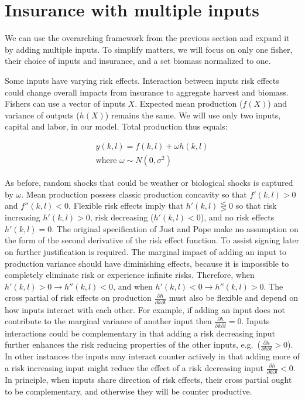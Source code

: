 \documentclass[
  letterpaper,
  DIV=11,
  numbers=noendperiod]{scrartcl}
\theoremstyle{plain}
\theoremstyle{plain}
\theoremstyle{remark}
\begin{document}
\hypertarget{sec-multi}{%
\section{Insurance with multiple inputs}\label{sec-multi}}

We can use the overarching framework from the previous section and
expand it by adding multiple inputs. To simplify matters, we will focus
on only one fisher, their choice of inputs and insurance, and a set
biomass normalized to one.

Some inputs have varying risk effects. Interaction between inputs risk
effects could change overall impacts from insurance to aggregate harvest
and biomass. Fishers can use a vector of inputs \(X\). Expected mean
production (\(f(X)\)) and variance of outputs (\(h(X)\)) remains the
same. We will use only two inputs, capital and labor, in our model.
Total production thus equals:

\[
\begin{aligned}
y(k,l)=f(k,l)+\omega h(k,l)\\
\text{where }\omega \sim N(0,\sigma^2)
\end{aligned}
\]

As before, random shocks that could be weather or biological shocks is
captured by \(\omega\). Mean production possess classic production
concavity so that \(f'(k,l)>0\) and \(f''(k,l)<0\). Flexible risk
effects imply that \(h'(k,l)\lesseqgtr0\) so that risk increasing
\(h'(k,l)>0\), risk decreasing (\(h'(k,l)<0\)), and no risk effects
\(h'(k,l)=0\). The original specification of Just and Pope make no
assumption on the form of the second derivative of the risk effect
function. To assist signing later on further justification is required.
The marginal impact of adding an input to production variance should
have diminishing effects, because it is impossible to completely
eliminate risk or experience infinite risks. Therefore, when
\(h'(k,l)>0 \rightarrow h''(k,l)<0\), and when
\(h'(k,l)<0 \rightarrow h''(k,l)>0\). The cross partial of risk effects
on production \(\frac{\partial h}{\partial k \partial l}\) must also be
flexible and depend on how inputs interact with each other. For example,
if adding an input does not contribute to the marginal variance of
another input then \(\frac{\partial h}{\partial k \partial l}=0\).
Inputs interactions could be complementary in that adding a risk
decreasing input further enhances the risk reducing properties of the
other inputs, e.g.~(\(\frac{\partial h}{\partial k \partial l}>0\)). In
other instances the inputs may interact counter actively in that adding
more of a risk increasing input might reduce the effect of a risk
decreasing input \(\frac{\partial h}{\partial k \partial l}<0\). In
principle, when inputs share direction of risk effects, their cross
partial ought to be complementary, and otherwise they will be counter
productive.
\end{document}
